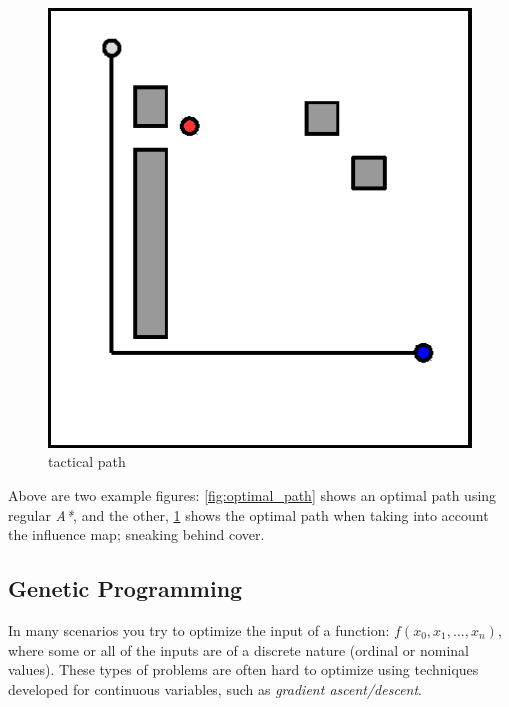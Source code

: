 \documentclass[a4paper, twocolumn]{article}
\begin{document}
\begin{minipage}{\linewidth}
	\begin{minipage}{0.45\linewidth}
	\begin{figure}[H]
        \centering
		\includegraphics[width=\linewidth]{share/good.eps}
		\caption{tactical path}
		\label{fig:smart_path}
	\end{figure}
	\end{minipage}
\end{minipage}

\vspace{0.5em}

    Above are two example figures: \cref{fig:optimal_path} shows an optimal path using regular \emph{A*}, and the other, \cref{fig:smart_path} shows the optimal path when taking into account the influence map; sneaking behind cover.
	
	\subsection{Genetic Programming} \label{sec:genetic_programming}

    In many scenarios you try to optimize the input of a function: \(f(x_0,x_1,...,x_n)\), where some or all of the inputs are of a discrete nature (ordinal or nominal values). These types of problems are often hard to optimize using techniques developed for continuous variables, such as \emph{gradient ascent/descent}.
\end{document}
